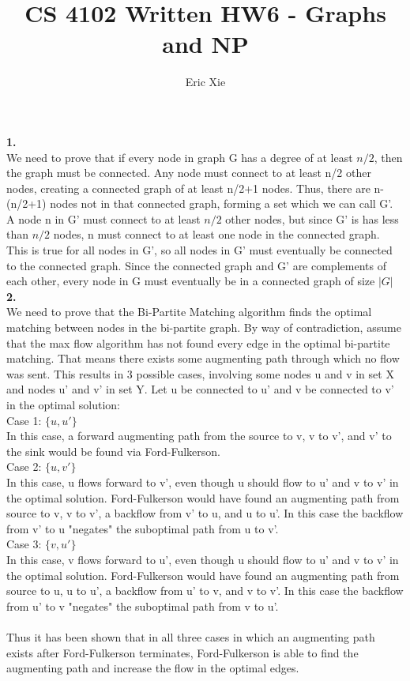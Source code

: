 \documentclass[a4paper,12pt]{article}
\title{CS 4102 Written HW6 - Graphs and NP}
\author{Eric Xie}
\begin{document}
\maketitle
\noindent \textbf{1.} \\
We need to prove that if every node in graph G has a degree of at least $n/2$, then the graph must be connected. Any node must connect to at least n/2 other nodes, creating a connected graph of at least n/2+1 nodes. Thus, there are n-(n/2+1) nodes not in that connected graph, forming a set which we can call G'. A node n in G' must connect to at least $n/2$ other nodes, but since G' is has less than $n/2$ nodes, n must connect to at least one node in the connected graph. This is true for all nodes in G', so all nodes in G' must eventually be connected to the connected graph. Since the connected graph and G' are complements of each other, every node in G must eventually be in a connected graph of size $|G|$\\

\noindent \textbf{2.}\\
We need to prove that the Bi-Partite Matching algorithm finds the optimal matching between nodes in the bi-partite graph. By way of contradiction, assume  that the max flow algorithm has not found every edge in the optimal bi-partite matching. That means there exists some augmenting path through which no flow was sent. This results in 3 possible cases, involving some nodes u and v in set X and nodes u' and v' in set Y. Let u be connected to u' and v be connected to v' in the optimal solution:\\
Case 1: $\{u,u'\}$\\
In this case, a forward augmenting path from the source to v, v to v', and v' to the sink would be found via Ford-Fulkerson.\\
Case 2: $\{u,v'\}$\\
In this case, u flows forward to v', even though u should flow to u' and v to v' in the optimal solution. Ford-Fulkerson would have found an augmenting path from source to v, v to v', a backflow from v' to u, and u to u'. In this case the backflow from v' to u "negates" the suboptimal path from u to v'. \\
Case 3: $\{v,u'\}$\\
In this case, v flows forward to u', even though u should flow to u' and v to v' in the optimal solution. Ford-Fulkerson would have found an augmenting path from source to u, u to u', a backflow from u' to v, and v to v'. In this case the backflow from u' to v "negates" the suboptimal path from v to u'. \\\\
Thus it has been shown that in all three cases in which an augmenting path exists after Ford-Fulkerson terminates, Ford-Fulkerson is able to find the augmenting path and increase the flow in the optimal edges. \\
\end{document}
